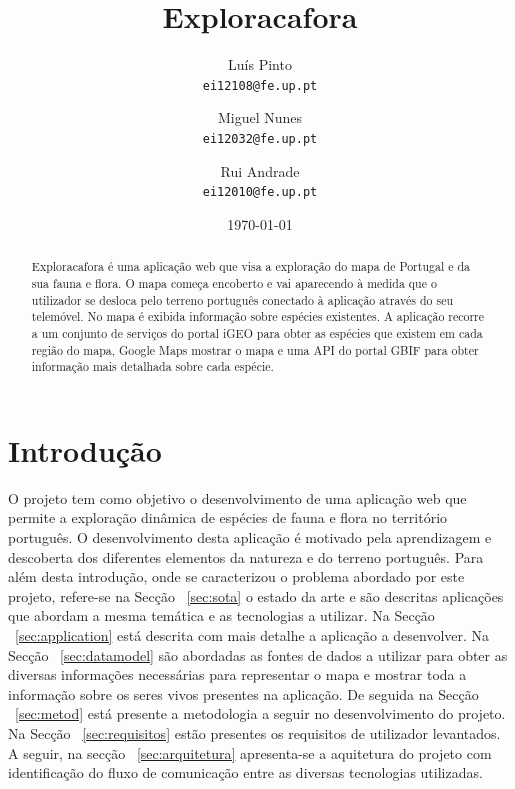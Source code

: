 \documentclass[twocolumn,twoside,11pt,a4paper]{article}
\title{\vspace{-15mm}\fontsize{24pt}{10pt}\selectfont\textbf{Exploracafora}} %
\author{Luís Pinto\\
\small \texttt{ei12108@fe.up.pt}\\
\and
Miguel Nunes\\
\small \texttt{ei12032@fe.up.pt}\\
\and
Rui Andrade\\
\small \texttt{ei12010@fe.up.pt}
\vspace{-5mm}
}
\date{\today}
\begin{document}
\maketitle
\thispagestyle{plain}            %


\begin{abstract}
Exploracafora é uma aplicação web que visa a exploração do mapa de Portugal e da sua fauna e flora. O mapa começa encoberto e vai aparecendo à medida que o utilizador se desloca pelo terreno português conectado à aplicação através do seu telemóvel. No mapa é exibida informação sobre espécies existentes. A aplicação recorre a um conjunto de serviços do portal iGEO para obter as espécies que existem em cada região do mapa, Google Maps mostrar o mapa e uma API do portal GBIF para obter informação mais detalhada sobre cada espécie.
\end{abstract}


\section{Introdução}\label{sec:intro}
O projeto tem como objetivo o desenvolvimento de uma aplicação web que permite a exploração dinâmica de espécies de fauna e flora no território português. O desenvolvimento desta aplicação é motivado pela aprendizagem e descoberta dos diferentes elementos da natureza e do terreno português.
Para além desta introdução, onde se caracterizou o problema abordado por este projeto, refere-se na Secção ~\ref{sec:sota} o estado da arte e são descritas aplicações que abordam a mesma temática e as tecnologias a utilizar. Na Secção ~\ref{sec:application} está descrita com mais detalhe a aplicação a desenvolver. Na Secção ~\ref{sec:datamodel} são abordadas as fontes de dados a utilizar para obter as diversas informações necessárias para representar o mapa e mostrar toda a informação sobre os seres vivos presentes na aplicação. De seguida na Secção ~\ref{sec:metod} está presente a metodologia a seguir no desenvolvimento do projeto. Na Secção ~\ref{sec:requisitos} estão presentes os requisitos de utilizador levantados. A seguir, na secção ~\ref{sec:arquitetura} apresenta-se a aquitetura do projeto com identificação do fluxo de comunicação entre as diversas tecnologias utilizadas.
\end{document}
